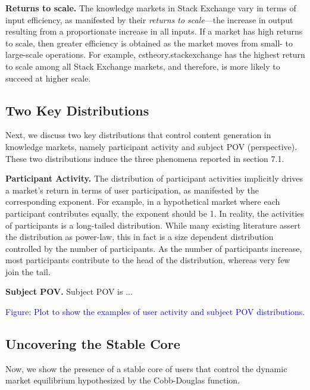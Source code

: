 \textbf{Returns to scale.} The knowledge markets in Stack Exchange vary in terms of input efficiency, as manifested by their \emph{returns to scale}---the increase in output resulting from a proportionate increase in all inputs. If a market has high returns to scale, then greater efficiency is obtained as the market moves from small- to large-scale operations. For example, cstheory.stackexchange has the highest return to scale among all Stack Exchange markets, and therefore, is more likely to succeed at higher scale.

\subsection{Two Key Distributions} 
Next, we discuss two key distributions that control content generation in knowledge markets, namely participant activity and subject POV (perspective). These two distributions induce the three phenomena reported in section 7.1. 

\textbf{Participant Activity.} The distribution of participant activities implicitly drives a market's return in terms of user participation, as manifested  by the corresponding exponent. For example, in a hypothetical market where each participant contributes equally, the exponent should be 1. In reality, the activities of participants is a long-tailed distribution. While many existing literature assert the distribution as power-law, this in fact is a size dependent distribution controlled by the number of participants. As the number of participants increase, most participants contribute to the head of the distribution, whereas very few join the tail.

\textbf{Subject POV.} Subject POV is ...

\textcolor{blue}{Figure: Plot to show the examples of user activity and subject POV distributions.}

\subsection{Uncovering the Stable Core} 
Now, we show the presence of a stable core of users that control the dynamic market equilibrium hypothesized by the Cobb-Douglas function.

